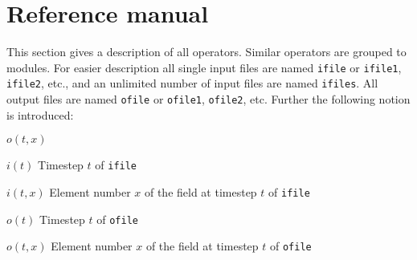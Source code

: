 \chapter{\label{refman}Reference manual}

This section gives a description of all operators.
Similar operators are grouped to modules.
For easier description all single input files are named {\tt ifile} or {\tt ifile1}, {\tt ifile2}, etc.,
and an unlimited number of input files are named {\tt ifiles}.
All output files are named {\tt ofile} or {\tt ofile1}, {\tt ofile2}, etc.
Further the following notion is introduced:
\begin{defalist}{\(o(t,x)\)}
\item[\(i(t)\)\hfill]
Timestep \(t\) of {\tt ifile}
\item[\(i(t,x)\)\hfill]
Element number \(x\) of the field at timestep \(t\) of {\tt ifile}
\item[\(o(t)\)\hfill]
Timestep \(t\) of {\tt ofile}
\item[\(o(t,x)\)\hfill]
Element number \(x\) of the field at timestep \(t\) of {\tt ofile}
\end{defalist}




